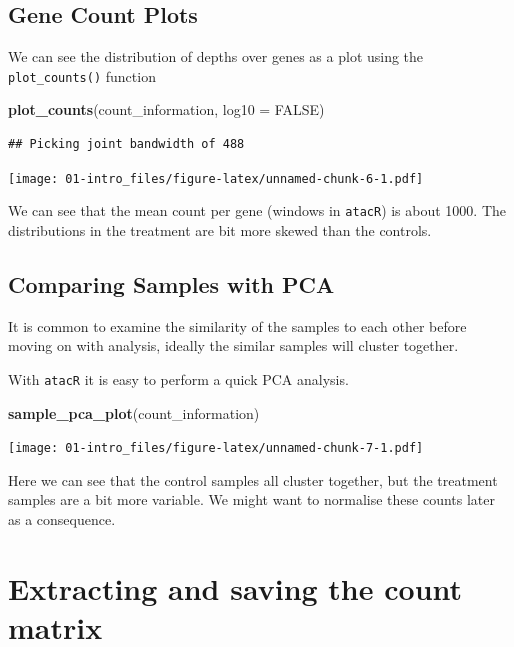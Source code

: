 \documentclass[]{book}
\newenvironment{Shaded}{\begin{snugshade}}{\end{snugshade}}
\newcommand{\DataTypeTok}[1]{\textcolor[rgb]{0.13,0.29,0.53}{#1}}
\newcommand{\KeywordTok}[1]{\textcolor[rgb]{0.13,0.29,0.53}{\textbf{#1}}}
\newcommand{\NormalTok}[1]{#1}
\newcommand{\OtherTok}[1]{\textcolor[rgb]{0.56,0.35,0.01}{#1}}
\begin{document}
\hypertarget{gene-count-plots}{%
\subsection{Gene Count Plots}\label{gene-count-plots}}

We can see the distribution of depths over genes as a plot using the \texttt{plot\_counts()} function

\begin{Shaded}
\begin{Highlighting}[]
\KeywordTok{plot_counts}\NormalTok{(count_information, }\DataTypeTok{log10 =} \OtherTok{FALSE}\NormalTok{)}
\end{Highlighting}
\end{Shaded}

\begin{verbatim}
## Picking joint bandwidth of 488
\end{verbatim}

\texttt{[image: 01-intro\_files/figure-latex/unnamed-chunk-6-1.pdf]}

We can see that the mean count per gene (windows in \texttt{atacR}) is about 1000. The distributions in the treatment are bit more skewed than the controls.

\hypertarget{comparing-samples-with-pca}{%
\subsection{Comparing Samples with PCA}\label{comparing-samples-with-pca}}

It is common to examine the similarity of the samples to each other before moving on with analysis, ideally the similar samples will cluster together.

With \texttt{atacR} it is easy to perform a quick PCA analysis.

\begin{Shaded}
\begin{Highlighting}[]
\KeywordTok{sample_pca_plot}\NormalTok{(count_information)}
\end{Highlighting}
\end{Shaded}

\texttt{[image: 01-intro\_files/figure-latex/unnamed-chunk-7-1.pdf]}

Here we can see that the control samples all cluster together, but the treatment samples are a bit more variable. We might want to normalise these counts later as a consequence.

\hypertarget{extracting-and-saving-the-count-matrix}{%
\section{Extracting and saving the count matrix}\label{extracting-and-saving-the-count-matrix}}
\end{document}
